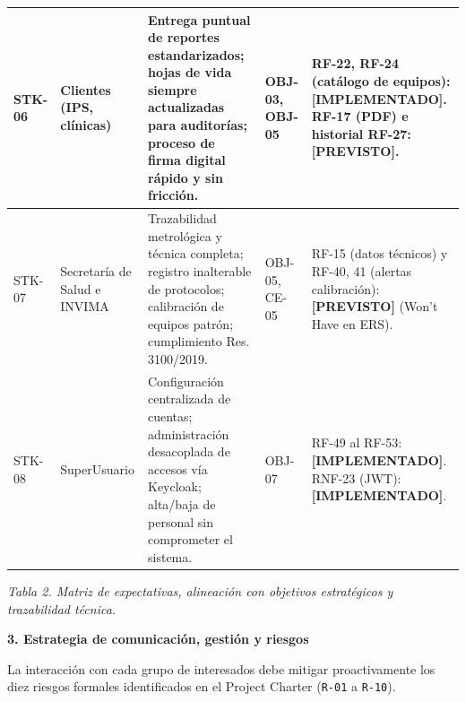 \documentclass[12pt,varwidth=170mm,border=10pt]{standalone}
\newcommand{\sectiontitle}[1]{%
  \par\vspace{1.8ex}%
  {\normalfont\Large\bfseries #1\par}%
  \vspace{1.0ex}%
}
\newcommand{\estadoImplementado}{\textcolor{mainRed}{\textbf{[IMPLEMENTADO]}}}
\newcommand{\estadoPrevisto}{\textcolor{mainGray}{\textbf{[PREVISTO]}}}
\newcommand{\tablecaption}[2]{%
  \par\vspace{0.4em}%
  \begin{center}
    \footnotesize\textit{Tabla #1. #2}
  \end{center}
  \vspace{1.0em}%
}
\begin{document}
\begin{center}
\begin{tabular}{|C{1.2cm}|L{2.8cm}|L{4.9cm}|L{2.0cm}|L{3.3cm}|}
\hline
STK-06 & Clientes (IPS, clínicas) & Entrega puntual de reportes estandarizados; hojas de vida siempre actualizadas para auditorías; proceso de firma digital rápido y sin fricción. & OBJ-03, OBJ-05 & RF-22, RF-24 (catálogo de equipos): \estadoImplementado{}. \newline RF-17 (PDF) e historial RF-27: \estadoPrevisto{}. \\
\hline
STK-07 & Secretaría de Salud e INVIMA & Trazabilidad metrológica y técnica completa; registro inalterable de protocolos; calibración de equipos patrón; cumplimiento Res. 3100/2019. & OBJ-05, CE-05 & RF-15 (datos técnicos) y RF-40, 41 (alertas calibración): \estadoPrevisto{} (Won't Have en ERS). \\
\hline
STK-08 & SuperUsuario & Configuración centralizada de cuentas; administración desacoplada de accesos vía Keycloak; alta/baja de personal sin comprometer el sistema. & OBJ-07 & RF-49 al RF-53: \estadoImplementado{}. \newline RNF-23 (JWT): \estadoImplementado{}. \\
\hline
\end{tabular}
\end{center}
\tablecaption{2}{Matriz de expectativas, alineación con objetivos estratégicos y trazabilidad técnica.}
\endgroup

\sectiontitle{3. Estrategia de comunicación, gestión y riesgos}

La interacción con cada grupo de interesados debe mitigar proactivamente los diez riesgos formales identificados en el Project Charter (\texttt{R-01} a \texttt{R-10}).
\end{document}
